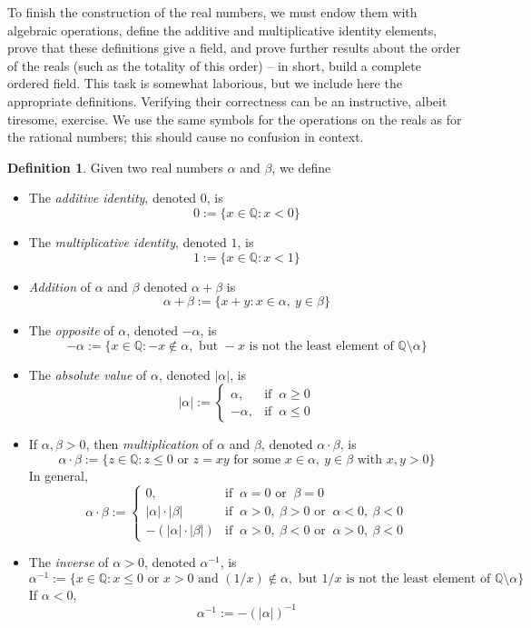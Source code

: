 \documentclass[12pt]{article}
\theoremstyle{definition}
\newtheorem*{defn}{Definition}
\theoremstyle{definition}
\theoremstyle{definition}
\newcommand{\QQ}{\mathbb{Q}}
\begin{document}
To finish the construction of the real numbers, we must endow them with algebraic operations, define the additive
and multiplicative identity elements, prove that these definitions give a field, and prove further results about the order of the reals (such as the totality of this
order) -- in short, build a complete ordered field.  This task is somewhat laborious, but we include here the
appropriate definitions.  Verifying their correctness can be an instructive, albeit tiresome, exercise.  We use the 
same symbols for the operations on the reals as for the rational numbers; this should cause no confusion in context.

\begin{defn}
Given two real numbers $\alpha$ and $\beta$, we define
\begin{itemize}
\item
 The \emph{additive identity}, denoted $0$, is 
  \[0 := \{ x \in \QQ : x < 0 \} \]
\item
 The \emph{multiplicative identity}, denoted $1$, is
  \[1 := \{x \in \QQ : x < 1 \} \]
\item
 \emph{Addition} of $\alpha$ and $\beta$ denoted $\alpha + \beta$ is
\[ \alpha + \beta := \{x + y : x \in \alpha, ~y \in \beta \} \]
\item
 The \emph{opposite} of $\alpha$, denoted $-\alpha$, is
  \[ -\alpha := \{x \in \QQ: -x \not\in \alpha, \mbox{ but } -x \mbox{ is not the least element of }
    \QQ \setminus \alpha \} \]
\item
 The \emph{absolute value} of $\alpha$, denoted $|\alpha|$, is
\begin{equation*}
|\alpha| :=
 \begin{cases}
   \alpha, &\text{if } ~\alpha \geq 0 \\
  -\alpha, &\text{if } ~\alpha \leq 0
 \end{cases}
\end{equation*}
\item
 If $\alpha, \beta > 0$, then \emph{multiplication} of $\alpha$ and $\beta$, denoted $\alpha \cdot \beta$, is
  \[\alpha \cdot \beta := \{z \in \QQ : z \leq 0 \mbox{ or } z = xy \mbox{ for some } x \in \alpha, ~y \in \beta 
               \mbox{ with } x, y > 0 \} \]
 In general, 
 \begin{equation*}
 \alpha \cdot \beta :=
  \begin{cases}
    0,                    &\text{if } ~\alpha = 0  \text{ or } ~\beta = 0 \\
    |\alpha|\cdot|\beta|  &\text{if } ~\alpha > 0, ~\beta > 0 \text { or } ~\alpha < 0, ~\beta < 0 \\
    -(|\alpha|\cdot|\beta|) &\text{if } ~\alpha > 0, ~\beta < 0 \text { or } ~\alpha > 0, ~\beta < 0
   \end{cases}
  \end{equation*}
\item
The \emph{inverse} of $\alpha > 0$, denoted $\alpha^{-1}$, is
\[
\alpha^{-1} := \{x \in \QQ : x \leq 0 \text{ or } x > 0 \text{ and } (1/x) \not\in \alpha, \text{ but }
                1/x \text{ is not the least element of } \QQ \setminus \alpha \}
\]
If $\alpha < 0$, 
\[ \alpha^{-1} :=  -(|\alpha|)^{-1}  \]
 

\end{itemize}
\end{defn}
\end{document}
